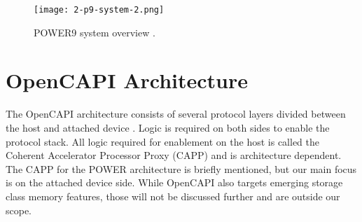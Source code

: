 \begin{figure}[h]
  \centering
  \texttt{[image: 2-p9-system-2.png]}
  \caption{POWER9 system overview \cite{thompto-power9}.}
  \label{fig:2-p9-system}
\end{figure}





\section{OpenCAPI Architecture}

The OpenCAPI architecture consists of several protocol layers divided between the host and attached device \cite{ocapi-dl} \cite{ocapi-tl}. Logic is required on both sides to enable the protocol stack. All logic required for enablement on the host is called the Coherent Accelerator Processor Proxy (CAPP) and is architecture dependent. The CAPP for the POWER architecture is briefly mentioned, but our main focus is on the attached device side. While OpenCAPI also targets emerging storage class memory features, those will not be discussed further and are outside our scope.



